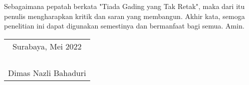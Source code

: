 Sebagaimana pepatah berkata "Tiada Gading yang Tak Retak", maka dari itu penulis mengharapkan kritik dan saran yang membangun. Akhir kata, semoga penelitian ini dapat digunakan semestinya dan bermanfaat bagi semua. Amin. 

\begin{flushright}
  \begin{tabular}[b]{c}
    Surabaya, Mei 2022\\ 
    \\
    \\
    \\
    \\
    Dimas Nazli Bahaduri
  \end{tabular}
\end{flushright}
